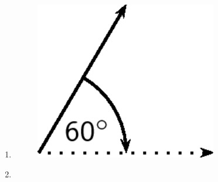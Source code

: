 \begin{enumerate}[noitemsep, label=\textbf{\arabic*}. ]
\begin{enumerate}[noitemsep, label=\textbf{\alph*}. ]
\begin{figure}[H]
\begin{center}
      \vspace{2pt}
    \vspace{.1in}
    
    \end{center}

 \end{figure}   

    \addtocounter{footnote}{-0}
    \label{m38812*uid16}\item 
    \setcounter{subfigure}{0}


	\begin{figure}[H] %
    \begin{center}
    \label{m38812*id187668!!!underscore!!!media}\label{m38812*id187668!!!underscore!!!printimage}\includegraphics[width=300px]{col11305.imgs/m38812_PG11C1_008.png} %
        
      \vspace{2pt}
    \vspace{.1in}
    
    \end{center}

 \end{figure}   

    \addtocounter{footnote}{-0}
    \label{m38812*uid17}\item 
    \setcounter{subfigure}{0}



\end{enumerate}
\end{enumerate}
